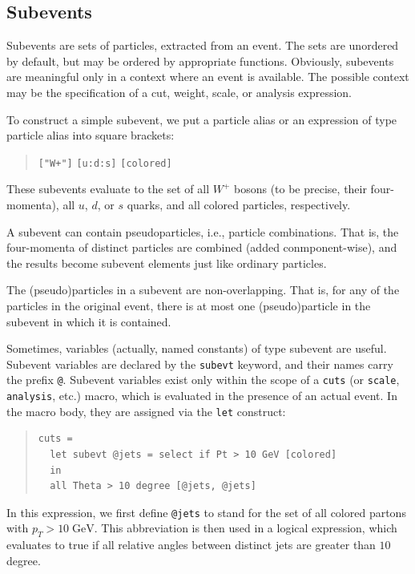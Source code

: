 \documentclass[12pt]{book}
\newcommand{\ttt}[1]{\texttt{#1}}
\begin{document}
\subsection{Subevents}

Subevents are sets of particles, extracted from an event.  The sets are
unordered by default, but may be ordered by appropriate functions.  Obviously,
subevents are meaningful only in a context where an event is available.  The
possible context may be the specification of a cut, weight, scale, or analysis
expression.

To construct a simple subevent, we put a particle alias or an expression of
type particle alias into square brackets:
\begin{quote}
\begin{footnotesize}
  \verb|["W+"]|\quad
  \verb|[u:d:s]|\quad
  \verb|[colored]|
\end{footnotesize}
\end{quote}
These subevents evaluate to the set of all $W^+$ bosons (to be precise, their
four-momenta), all $u$, $d$, or $s$ quarks, and all colored particles,
respectively.

A subevent can contain pseudoparticles, i.e., particle combinations.
That is, the four-momenta of
distinct particles are combined (added conmponent-wise), and the results
become subevent elements just like ordinary particles.

The (pseudo)particles in a subevent are non-overlapping.  That is, for
any of the particles in the original event, there is at most one
(pseudo)particle in the subevent in which it is contained.

Sometimes, variables (actually, named constants) of type subevent are useful.
Subevent variables are declared by the \ttt{subevt} keyword, and their
names carry the prefix \verb|@|.  Subevent variables exist only within the
scope of a \verb|cuts| (or \verb|scale|, \verb|analysis|, etc.) macro, which
is evaluated in the presence of an actual event.  In the macro body, they are
assigned via the \ttt{let} construct:
\begin{quote}
\begin{footnotesize}
\begin{verbatim}
cuts =
  let subevt @jets = select if Pt > 10 GeV [colored]
  in
  all Theta > 10 degree [@jets, @jets]
\end{verbatim}
\end{footnotesize}
\end{quote}
In this expression, we first define \verb|@jets| to stand for the set of all
colored partons with $p_T>10\;\mathrm{GeV}$.  This abbreviation is then used
in a logical expression, which evaluates to true if all relative angles
between distinct jets are greater than $10$ degree.
\end{document}
